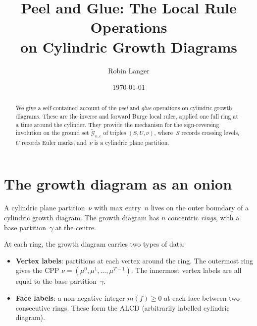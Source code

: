 \documentclass[11pt]{article}
\title{Peel and Glue: The Local Rule Operations\\
  on Cylindric Growth Diagrams}
\author{Robin Langer}
\date{\today}
\theoremstyle{plain}
\theoremstyle{definition}
\begin{document}
\maketitle

\begin{abstract}
We give a self-contained account of the \emph{peel} and \emph{glue}
operations on cylindric growth diagrams.  These are the inverse and
forward Burge local rules, applied one full ring at a time around the
cylinder.  They provide the mechanism for the sign-reversing involution
on the ground set $\widetilde{\mathcal{G}}_{n,c}$ of triples
$(S, U, \nu)$, where~$S$ records crossing levels, $U$ records Euler
marks, and~$\nu$ is a cylindric plane partition.
\end{abstract}

\tableofcontents


\section{The growth diagram as an onion}
\label{sec:onion}

A cylindric plane partition~$\nu$ with max entry~$n$ lives on the
outer boundary of a cylindric growth diagram.  The growth diagram has
$n$ concentric \emph{rings}, with a base partition~$\gamma$ at the
centre.

\begin{center}
\end{center}

At each ring, the growth diagram carries two types of data:
\begin{itemize}
  \item \textbf{Vertex labels}: partitions at each vertex around the
    ring.  The outermost ring gives the CPP
    $\nu = (\mu^0, \mu^1, \ldots, \mu^{T-1})$.  The innermost vertex
    labels are all equal to the base partition~$\gamma$.
  \item \textbf{Face labels}: a non-negative integer $m(f) \geq 0$ at
    each face between two consecutive rings.  These form the ALCD
    (arbitrarily labelled cylindric diagram).
\end{itemize}
\end{document}
